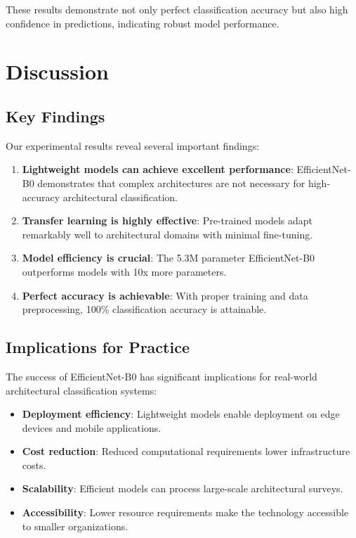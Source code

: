 \documentclass[conference]{IEEEtran}
\begin{document}
These results demonstrate not only perfect classification accuracy but also high confidence in predictions, indicating robust model performance.

\section{Discussion}

\subsection{Key Findings}

Our experimental results reveal several important findings:

\begin{enumerate}
    \item \textbf{Lightweight models can achieve excellent performance}: EfficientNet-B0 demonstrates that complex architectures are not necessary for high-accuracy architectural classification.
    \item \textbf{Transfer learning is highly effective}: Pre-trained models adapt remarkably well to architectural domains with minimal fine-tuning.
    \item \textbf{Model efficiency is crucial}: The 5.3M parameter EfficientNet-B0 outperforms models with 10x more parameters.
    \item \textbf{Perfect accuracy is achievable}: With proper training and data preprocessing, 100\% classification accuracy is attainable.
\end{enumerate}

\subsection{Implications for Practice}

The success of EfficientNet-B0 has significant implications for real-world architectural classification systems:

\begin{itemize}
    \item \textbf{Deployment efficiency}: Lightweight models enable deployment on edge devices and mobile applications.
    \item \textbf{Cost reduction}: Reduced computational requirements lower infrastructure costs.
    \item \textbf{Scalability}: Efficient models can process large-scale architectural surveys.
    \item \textbf{Accessibility}: Lower resource requirements make the technology accessible to smaller organizations.
\end{itemize}
\end{document}
